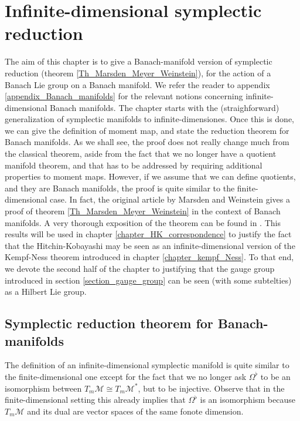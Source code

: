 \chapter{Infinite-dimensional symplectic reduction} \label{Chapter_inf_dim_sympl_red}
The aim of this chapter is to give a Banach-manifold version of symplectic reduction (theorem \ref{Th_Marsden_Meyer_Weinstein}), for the action of a Banach Lie group on a Banach manifold. We refer the reader to appendix \ref{appendix_Banach_manifolds} for the relevant notions concerning infinite-dimensional Banach manifolds. The chapter starts with the (straighforward) generalization of symplectic manifolds to infinite-dimensiones. Once this is done, we can give the definition of moment map, and state the reduction theorem for Banach manifolds. As we shall see, the proof does not really change much from the classical theorem, aside from the fact that we no longer have a quotient manifold theorem, and that has to be addressed by requiring additional properties to moment maps. However, if we assume that we can define quotients, and they are Banach manifolds, the proof is quite similar to the finite-dimensional case. In fact, the original article by Marsden and Weinstein \parencite{MARSDEN1974121} gives a proof of theorem \ref{Th_Marsden_Meyer_Weinstein} in the context of Banach manifolds. A very thorough exposition of the theorem can be found in \parencite{Gianetto}. This results will be used in chapter \ref{chapter_HK_correspondence} to justify the fact that the Hitchin-Kobayashi may be seen as an infinite-dimensional version of the Kempf-Ness theorem introduced in chapter  \ref{chapter_kempf_Ness}. To that end, we devote the second half of the chapter to justifying that the gauge group introduced in section \ref{section_gauge_group} can be seen (with some subtelties) as a Hilbert Lie group.  

\section{Symplectic reduction theorem for Banach-manifolds}
The definition of an infinite-dimensional symplectic manifold is quite similar to the finite-dimensional one except for the fact that we no longer ask \(\Omega^\flat\) to be an isomorphism between \(T_m\mathcal{M}\cong T_m\mathcal{M}^*\), but to be injective. Observe that in the finite-dimensional setting this already implies that \(\Omega^\flat\) is an isomorphism because \(T_m\mathcal{M}\) and its dual are vector spaces of the same fonote dimension.


